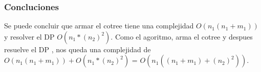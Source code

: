     \subsubsection{Concluciones}
    
    Se puede concluir que armar el cotree tiene una complejidad $O(n_1(n_1 + m_1))$ y resolver el DP $O(n_1 * (n_2)^2 )$.
    Como el agoritmo, arma el cotree y despues resuelve el DP , nos queda una complejidad de $O(n_1(n_1 + m_1)) + O(n_1 * (n_2)^2 )$ = $O(n_1((n_1 + m_1) + (n_2)^2 ))$.





   















